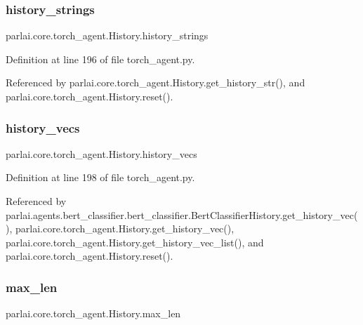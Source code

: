 \subsubsection{\texorpdfstring{history\+\_\+strings}{history\_strings}}
{\footnotesize\ttfamily parlai.\+core.\+torch\+\_\+agent.\+History.\+history\+\_\+strings}



Definition at line 196 of file torch\+\_\+agent.\+py.



Referenced by parlai.\+core.\+torch\+\_\+agent.\+History.\+get\+\_\+history\+\_\+str(), and parlai.\+core.\+torch\+\_\+agent.\+History.\+reset().

\mbox{\label{classparlai_1_1core_1_1torch__agent_1_1History_a7d5060a88829f087033ea7ba928ceb1d}} 
\subsubsection{\texorpdfstring{history\+\_\+vecs}{history\_vecs}}
{\footnotesize\ttfamily parlai.\+core.\+torch\+\_\+agent.\+History.\+history\+\_\+vecs}



Definition at line 198 of file torch\+\_\+agent.\+py.



Referenced by parlai.\+agents.\+bert\+\_\+classifier.\+bert\+\_\+classifier.\+Bert\+Classifier\+History.\+get\+\_\+history\+\_\+vec(), parlai.\+core.\+torch\+\_\+agent.\+History.\+get\+\_\+history\+\_\+vec(), parlai.\+core.\+torch\+\_\+agent.\+History.\+get\+\_\+history\+\_\+vec\+\_\+list(), and parlai.\+core.\+torch\+\_\+agent.\+History.\+reset().

\mbox{\label{classparlai_1_1core_1_1torch__agent_1_1History_acded8e2717f7b9d527076c89a7fbd3f9}} 
\subsubsection{\texorpdfstring{max\+\_\+len}{max\_len}}
{\footnotesize\ttfamily parlai.\+core.\+torch\+\_\+agent.\+History.\+max\+\_\+len}



